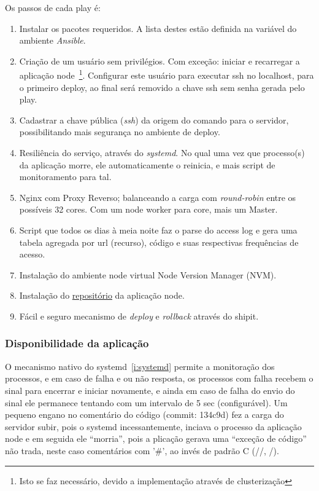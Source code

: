 
Os passos de cada play é:
\begin{enumerate}
     \item Instalar os pacotes requeridos. A lista destes estão
     definida na variável do ambiente \emph{Ansible}.
     \item Criação de um usuário sem privilégios. Com exceção: iniciar e
     recarregar a aplicação node~\footnote{Isto se faz 
     necessário, devido a implementação através de
     clusterização}. Configurar este usuário para executar ssh no
   localhost, para o primeiro deploy, ao final será removido a chave
   ssh sem senha gerada pelo play.
    \item Cadastrar a chave pública (\emph{ssh}) da origem do comando
      para o servidor, possibilitando mais segurança no ambiente de deploy.
    \item Resiliência do serviço, através do \emph{systemd}. No qual
        uma vez que processo(s) da aplicação morre, ele automaticamente
        o reinicia, e mais script de monitoramento para tal. \label{i:systemd}
    \item Nginx com Proxy Reverso; balanceando a carga com
      \emph{round-robin} entre os possíveis 32 cores. Com um node
      worker para core, mais um Master. \label{i:nginx}
    \item Script que todos os dias à meia noite faz o parse do access
      log e gera uma tabela agregada por url (recurso), código e suas
      respectivas frequências de acesso.
    \item Instalação do ambiente node virtual Node Version Manager
      (NVM).
    \item Instalação do
      \href{https://github.com/alessandro11/desafio-2.git}{repositório}
      da aplicação node.
    \item Fácil e seguro mecanismo de \emph{deploy} e \emph{rollback}
      através do shipit.
\end{enumerate}


\subsubsection{Disponibilidade da aplicação}
O mecanismo nativo do systemd~\ref{i:systemd} permite a monitoração dos
processos, e em caso de falha e ou não resposta, os processos com falha recebem o sinal para
encerrar e iniciar novamente, e ainda em caso de falha do envio do
sinal ele permanece tentando com um intervalo de 5 sec
(configurável). Um pequeno engano no comentário do código (commit:
134c9d) fez a carga do servidor subir, pois o systemd incessantemente,
inciava o processo da aplicação node e em seguida ele ``morria'', pois
a plicação gerava uma ``exceção de código'' não trada, neste caso
comentários com '\#', ao invés de padrão C (//,
/\textasteriskcentered\textasteriskcentered).

